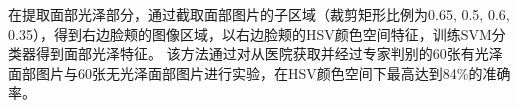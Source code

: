 在提取面部光泽部分，通过截取面部图片的子区域（裁剪矩形比例为{0.65, 0.5, 0.6, 0.35}），得到右边脸颊的图像区域，以右边脸颊的HSV颜色空间特征，训练SVM分类器得到面部光泽特征。
该方法通过对从医院获取并经过专家判别的60张有光泽面部图片与60张无光泽面部图片进行实验，在HSV颜色空间下最高达到84\%的准确率\cite{周睿2010中医面诊中光泽判别的研究}。
%
%
%
%
%
%
%
%
%
